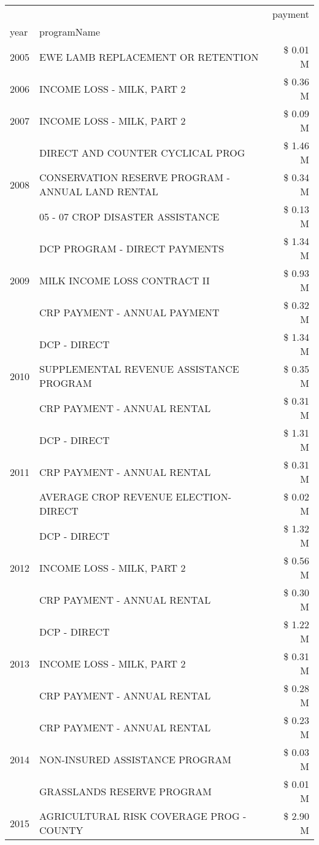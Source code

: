 \begin{tabular}{llr}
\toprule
 &  & payment \\
year & programName &  \\
\midrule
2005 & EWE LAMB REPLACEMENT OR RETENTION & \$ 0.01 M \\
\cline{1-3}
2006 & INCOME LOSS - MILK, PART 2 & \$ 0.36 M \\
\cline{1-3}
2007 & INCOME LOSS - MILK, PART 2 & \$ 0.09 M \\
\cline{1-3}
\multirow[t]{3}{*}{2008} & DIRECT AND COUNTER CYCLICAL PROG & \$ 1.46 M \\
 & CONSERVATION RESERVE PROGRAM - ANNUAL LAND RENTAL & \$ 0.34 M \\
 & 05 - 07 CROP DISASTER ASSISTANCE & \$ 0.13 M \\
\cline{1-3}
\multirow[t]{3}{*}{2009} & DCP PROGRAM - DIRECT PAYMENTS & \$ 1.34 M \\
 & MILK INCOME LOSS CONTRACT II & \$ 0.93 M \\
 & CRP PAYMENT - ANNUAL PAYMENT & \$ 0.32 M \\
\cline{1-3}
\multirow[t]{3}{*}{2010} & DCP - DIRECT & \$ 1.34 M \\
 & SUPPLEMENTAL REVENUE ASSISTANCE PROGRAM & \$ 0.35 M \\
 & CRP PAYMENT - ANNUAL RENTAL & \$ 0.31 M \\
\cline{1-3}
\multirow[t]{3}{*}{2011} & DCP - DIRECT & \$ 1.31 M \\
 & CRP PAYMENT - ANNUAL RENTAL & \$ 0.31 M \\
 & AVERAGE CROP REVENUE ELECTION-DIRECT & \$ 0.02 M \\
\cline{1-3}
\multirow[t]{3}{*}{2012} & DCP - DIRECT & \$ 1.32 M \\
 & INCOME LOSS - MILK, PART 2 & \$ 0.56 M \\
 & CRP PAYMENT - ANNUAL RENTAL & \$ 0.30 M \\
\cline{1-3}
\multirow[t]{3}{*}{2013} & DCP - DIRECT & \$ 1.22 M \\
 & INCOME LOSS - MILK, PART 2 & \$ 0.31 M \\
 & CRP PAYMENT - ANNUAL RENTAL & \$ 0.28 M \\
\cline{1-3}
\multirow[t]{3}{*}{2014} & CRP PAYMENT - ANNUAL RENTAL & \$ 0.23 M \\
 & NON-INSURED ASSISTANCE PROGRAM & \$ 0.03 M \\
 & GRASSLANDS RESERVE PROGRAM & \$ 0.01 M \\
\cline{1-3}
\multirow[t]{3}{*}{2015} & AGRICULTURAL RISK COVERAGE PROG - COUNTY & \$ 2.90 M \\

\end{tabular}
